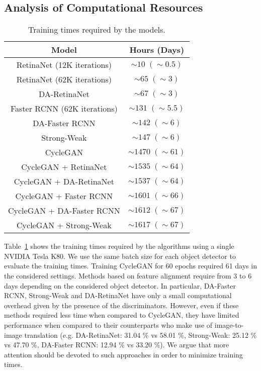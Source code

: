 \documentclass[preprint]{elsarticle}
\begin{document}
\subsection{Analysis of Computational Resources}
\label{computational_re}
\begin{table}[t!]
\caption{Training times required by the models.}
\label{time}
\centering
\begin{tabular}{|c||c|}
\hline
Model & Hours (Days) \\
\hline
RetinaNet (12K iterations) & $\sim 10\; (\sim 0.5)$\\
\hline
RetinaNet (62K iterations) & $\sim 65 \; (\sim 3)$\\
\hline
DA-RetinaNet & $\sim 67\; (\sim 3)$\\
\hline
Faster RCNN (62K iterations) &  $\sim 131 \; (\sim 5.5)$\\
\hline
DA-Faster RCNN & $\sim 142 \; (\sim 6)$\\
\hline
Strong-Weak & $\sim 147\; (\sim 6)$\\
\hline
CycleGAN &  $\sim 1470 \; (\sim 61)$\\
\hline
CycleGAN + RetinaNet &  $\sim 1535 \; (\sim 64)$\\
\hline
CycleGAN + DA-RetinaNet &  $\sim 1537 \; (\sim 64)$\\
\hline
CycleGAN + Faster RCNN &  $\sim 1601 \; (\sim 66)$\\
\hline
CycleGAN + DA-Faster RCNN &  $\sim 1612 \; (\sim 67)$\\
\hline
CycleGAN + Strong-Weak &  $\sim 1617 \; (\sim 67)$\\
\hline
\end{tabular}
\end{table}
Table~\ref{time} shows the training times required by the algorithms using a single NVIDIA Tesla K80. We use the same batch size for each object detector to evaluate the training times. Training CycleGAN for 60 epochs required 61 days in the considered settings. Methods based on feature alignment require from 3 to 6 days depending on the considered object detector. In particular, DA-Faster RCNN, Strong-Weak and DA-RetinaNet have only a small computational overhead given by the presence of the discriminators. However, even if these methods required less time when compared to CycleGAN, they have limited performance when compared to their counterparts who make use of image-to-image translation (e.g. DA-RetinaNet: 31.04 \% vs 58.01 \%, Strong-Weak: 25.12 \% vs 47.70 \%, DA-Faster RCNN: 12.94 \% vs 33.20 \%). We argue that more attention should be devoted to such approaches in order to minimize training times.
\end{document}
